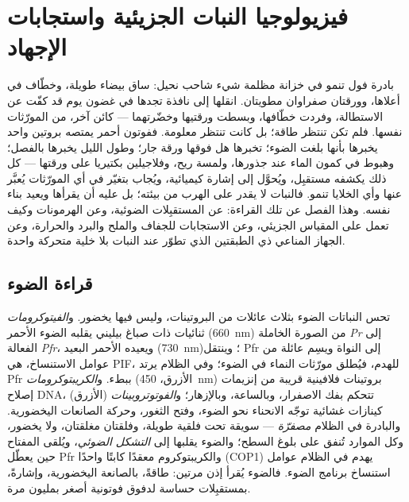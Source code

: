 \chapter{فيزيولوجيا النبات الجزيئية واستجابات الإجهاد}\label{ch:b3:plant-molecular-physiology}

بادرة فول تنمو في خزانة مظلمة شيء شاحب نحيل: ساق بيضاء
طويلة، وخطّاف في أعلاها، وورقتان صفراوان مطويتان. انقلها إلى
نافذة تجدها في غضون يوم قد كفّت عن الاستطالة، وفردت خطّافها،
وبسطت ورقتيها وخضّرتهما --- كائن آخر، من المورّثات نفسها. فلم
تكن تنتظر طاقة؛ بل كانت تنتظر معلومة. ففوتون أحمر يمتصه
بروتين واحد يخبرها بأنها بلغت الضوء؛  تخبرها هل فوقها ورقة جار؛ وطول الليل يخبرها بالفصل؛
وهبوط في كمون الماء عند جذورها، ولمسة ريح، وفلاجيلين بكتيريا
على ورقتها --- كل ذلك يكشفه مستقبِل، ويُحوَّل إلى إشارة
كيميائية، ويُجاب بتغيّر في أي المورّثات يُعبَّر عنها وأي
الخلايا تنمو. فالنبات لا يقدر على الهرب من بيئته؛ بل عليه أن
يقرأها ويعيد بناء نفسه. وهذا الفصل عن تلك القراءة: عن
المستقبِلات الضوئية، وعن الهرمونات وكيف تعمل على المقياس
الجزيئي، وعن الاستجابات للجفاف والملح والبرد والحرارة، وعن
الجهاز المناعي ذي الطبقتين الذي تطوّر عند النبات بلا خلية
متحركة واحدة.

\section{قراءة الضوء}

\begin{definition}\label{def:b3:plant-molecular-physiology:photoreceptors}
تحس النباتات الضوء بثلاث عائلات من البروتينات، وليس فيها
يخضور. و\emph{الفيتوكرومات} ثنائيات ذات صباغ بيليني يقلبه
الضوء الأحمر (\qty{660}{nm}) من الصورة الخاملة \emph{Pr} إلى
الفعالة \emph{Pfr}، ويعيده الأحمر البعيد (\qty{730}{nm})؛
وينتقل Pfr إلى النواة ويسِم عائلة من عوامل الاستنساخ، هي
PIF، للهدم، فيُطلق مورّثات النماء في الضوء؛ وفي الظلام يرتد
Pfr ببطء. و\emph{الكريبتوكرومات} (الأزرق، \qty{450}{nm})
بروتينات فلافينية قريبة من إنزيمات إصلاح DNA، تتحكم بفك
الاصفرار، وبالساعة، وبالإزهار؛ و\emph{الفوتوتروبينات}
(الأزرق) كينازات غشائية توجّه الانحناء نحو الضوء، وفتح
الثغور، وحركة الصانعات اليخضورية. والبادرة في الظلام
\emph{مصفرّة} --- سويقة تحت فلقية طويلة، وفلقتان مغلقتان، ولا
يخضور، وكل الموارد تُنفق على بلوغ السطح؛ والضوء يقلبها إلى
\emph{التشكل الضوئي}، ويُلقى المفتاح حين يعطّل Pfr
والكريبتوكروم معقدًا كابتًا واحدًا (COP1) يهدم في الظلام
عوامل استنساخ برنامج الضوء. فالضوء يُقرأ إذن مرتين: طاقةً،
بالصانعة اليخضورية، وإشارةً، بمستقبِلات حساسة لدفوق فوتونية
أصغر بمليون مرة.
\end{definition}

